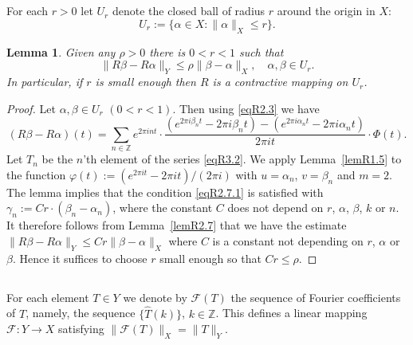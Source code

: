 \documentclass[reqno,a4paper,12pt]{amsart}
\numberwithin{equation}{section}
\numberwithin{figure}{section}
\newcommand\Z{\mathbb{Z}}
\newcommand\F{\mathcal{F}}
\newcommand\gam{\gamma}
\newcommand\1{\mathds{1}}
\renewcommand\leq{\leqslant}
\newcommand{\ft}[1]{\widehat{#1}}
\theoremstyle{plain}
\newtheorem{lem}[thm]{Lemma}
\newcommand{\lemref}[1]{Lemma~\ref{#1}}
\theoremstyle{definition}
\begin{document}
\subsection{}
For each $r>0$ let
 $U_r$ denote the closed ball of radius $r$ around the origin
in $X$:
\begin{equation}
\label{eqR3.1.1}
U_r := \{\alpha \in X : \|\alpha\|_X \leq r\}.
\end{equation}

\begin{lem}
\label{lemR3.1}
Given any $\rho > 0$ there is $0<r<1$ such that
\begin{equation}
\label{eqR3.1.2}
\|R\beta - R\alpha\|_Y \leq \rho \|\beta-\alpha\|_X,
\quad \alpha,\beta \in U_r.
\end{equation}
In particular, if $r$ is small enough then $R$ is
a contractive mapping on $U_r$.
\end{lem}

\begin{proof}
Let $\alpha,\beta \in U_r$ $(0<r < 1)$. Then using
\eqref{eqR2.3}  we  have
\begin{equation}
\label{eqR3.2}
(R \beta - R \alpha)(t) =
\sum_{n\in\mathbb Z} e^{2\pi int}\cdot \frac{(e^{2\pi i \beta_n t}
-2\pi i \beta_n t)
- ( e^{2\pi i\alpha_n t}
-2\pi i \alpha_n t) }{2\pi it} \cdot \Phi(t).
\end{equation}
Let $T_n$ be the $n$'th element of the series
\eqref{eqR3.2}. 
 We apply \lemref{lemR1.5} to the function
$\varphi(t) :=  (e^{2\pi i t} -  2 \pi i t)/(2\pi i)$
 with $u = \alpha_n$, 
$v = \beta_n$ and $m=2$.
The lemma implies that
the condition \eqref{eqR2.7.1} is satisfied
with $\gam_n := C r \cdot (\beta_n - \alpha_n)$,
 where the constant $C$ does not
 depend on $r$, $\alpha$, $\beta$, $k$ or $n$.
It therefore follows from \lemref{lemR2.7} that we have
the estimate
$\|R\beta - R\alpha\|_Y \leq Cr  \|\beta-\alpha\|_X$
where $C$ is a constant not depending on $r$, $\alpha$ or $\beta$.
Hence it suffices to choose $r$ small enough so that  $C r \leq  \rho$.
\end{proof}



\subsection{}
For each element $T \in Y$ we denote by $\F(T)$ 
the sequence of Fourier coefficients  of $T$, 
namely, the  sequence 
$\{\ft{T}(k)\}$, $k \in \Z$.
This defines a linear mapping  $\F: Y \to X$ satisfying
$\|\F(T)\|_X = \|T\|_Y$.
\end{document}
